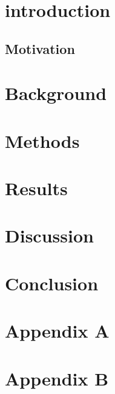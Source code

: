 \documentclass[draftthesis,tocnosub,noragright,centerchapter,12pt]{uiucecethesis09}
\begin{document}
\makeatletter
\makeatother

\mainmatter
\glsresetall

\chapter{introduction}
\section{Motivation}


\chapter{Background}


\chapter{Methods}


\chapter{Results}


\chapter{Discussion}


\chapter{Conclusion}




%


\backmatter


%



\clearpage
\setcounter{table}{0}
\renewcommand{\thetable}{A.\arabic{table}}
\appendix
\chapter{Appendix A}

\chapter{Appendix B}


\end{document}
